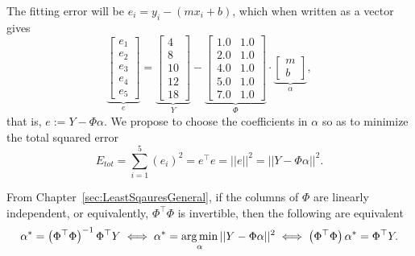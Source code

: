  The fitting error will be $e_i = y_i-(m x_i + b)$, which when written as a vector gives 
$$ \underbrace{\left[\begin{array}{r}
e_1\\ e_2\\ e_3 \\e_4\\ e_5 \end{array}\right]}_{e} =
\underbrace{ \left[\begin{array}{r}
4 \\  8 \\ 10 \\ 12 \\ 18 \end{array}\right]}_{Y}
-\underbrace{\left[\begin{array}{rr}
 1.0 & 1.0 \\
 2.0 & 1.0 \\
 4.0 & 1.0 \\
 5.0 & 1.0 \\
 7.0  & 1.0
 \end{array}\right]}_{\Phi} \cdot  \underbrace{\left[\begin{array}{r}
m\\
b
 \end{array}\right]}_{\alpha}, $$
 that is, $e:=Y-\Phi \alpha$. We propose to choose the coefficients in $\alpha$ so as to minimize the total squared error
  $$E_{tot} = \sum_{i=1}^{5} (e_i)^2 = e^\top e = ||e||^2= ||Y-\Phi \alpha ||^2.$$
  
\begin{tcolorbox}[sharp corners, colback=green!30, colframe=green!80!blue, title=\textbf{\large Least Squares Fit to Data also called Linear Regression}]

  From Chapter~\ref{sec:LeastSqauresGeneral}, if the columns of $\Phi$ are linearly independent, or equivalently, $\Phi^\top \Phi$ is invertible, then the following are equivalent 
  \begin{equation}
    \label{eq:ThmLeastSqaredErrorSolution2}
  \alpha^\ast = \left( \Phi^\top \Phi \right)^{-1}\Phi^\top Y  \iff  \alpha^\ast = \operatorname*{arg\,min}_{\alpha} ||Y-\Phi \alpha ||^2 \iff \left( \Phi^\top \Phi \right) \alpha^\ast = \Phi^\top Y.
\end{equation}
  
  \end{tcolorbox}
  \vspace*{.2cm}

